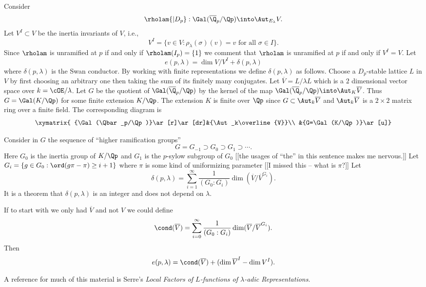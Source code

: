 \documentclass{report}
\begin{document}
Consider
$$\rholam{|D_p}:\Gal(\overline{\Q}_p/\Qp)\into\Aut_{E_{\lambda}} V.$$
Let $V^I\subset V$ be the inertia invariants of $V$, i.e.,
$$V^I=\{v\in V:\rho_{\lambda}(\sigma)(v)=v \text{ for all } \sigma\in I\}.$$
Since $\rholam$ is unramified at $p$ if and only if $\rholam(I_p)=\{1\}$ we
comment that $\rholam$ is unramified at $p$ if and only if $V^I=V$.
Let $$e(p,\lambda)=\dim V/V^I + \delta(p,\lambda)$$
where $\delta(p,\lambda)$ is the Swan conductor. By working with
finite representations we define $\delta(p,\lambda)$ as follows.
Choose a $D_p$-stable lattice $L$ in $V$ by first choosing an arbitrary
one then taking the sum of its finitely many conjugates.
Let $\overline{V}=L/\lambda L$ which is a $2$ dimensional
vector space over $k=\cOE/\lambda$. Let $G$ be the quotient of
$\Gal(\overline{\Q}_p/\Qp)$ by the kernel of the map
$\Gal(\overline{\Q}_p/\Qp)\into\Aut_K\overline{V}$.
Thus $G=\Gal(K/\Qp)$ for some finite extension $K/\Qp$.
The extension $K$ is finite over $\Qp$ since
$G\subset\Aut_k\overline{V}$ and $\Aut_k\overline{V}$
is a $2\times 2$ matrix ring over a finite field.
The corresponding diagram is
$$\xymatrix{
{\Gal(\Qbar_p/\Qp)}\ar[r]\ar[dr]&{\Aut_k\overline{V}}\\
                       &{G=\Gal(K/\Qp)}\ar[u]}$$

Consider in $G$ the sequence of ``higher ramification groups''
$$G=G_{-1}\supset G_0\supset G_1\supset\cdots.$$
Here $G_0$ is the inertia group of $K/\Qp$ and $G_1$ is the
$p$-sylow subgroup of $G_0$ [[the usages of ``the'' in this
sentence makes me nervous.]] Let $G_i=\{g\in G_0 : \ord(g\pi-\pi)\geq i+1\}$
where $\pi$ is some kind of uniformizing parameter [[I missed this -- what
is $\pi$?]] Let
$$\delta(p,\lambda)=\sum_{i=1}^{\infty} \frac{1}{(G_0:G_i)}\dim(\overline{V}/\overline{V}^{G_i}).$$
It is a theorem that $\delta(p,\lambda)$ is an integer and does not depend
on $\lambda$.

If to start with we only had $\overline{V}$ and not $V$ we could
define
$$\cond(\overline{V})=\sum_{i=0}^{\infty}\frac{1}{(G_0:G_i)}\dim(\overline{V}/\overline{V}^{G_i}).$$
Then $$e(p,\lambda)=\cond(\overline{V})+(\dim \overline{V}^I-\dim V^I).$$

A reference for much of this material is Serre's
{\em Local Factors of $L$-functions of $\lambda$-adic Representations}.

\end{document}
